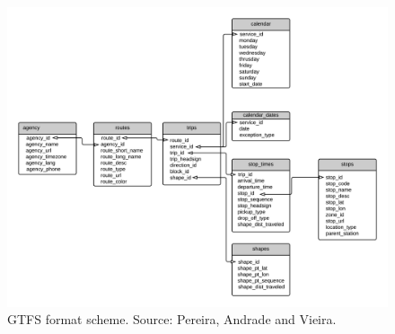 \begin{figure}[h!]
    \centering
    \includegraphics[width=\textwidth]{img/gtfs_scheme.png}
    \caption{GTFS format scheme. Source: Pereira, Andrade and Vieira\cite{pereira2023gtfs}.}
    \label{fig:gtfs_scheme}
\end{figure}

